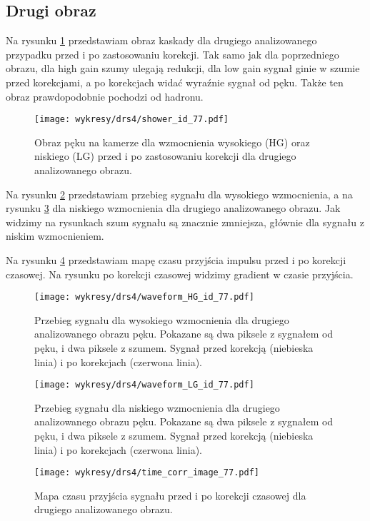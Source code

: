 \documentclass[a4paper,11pt,twoside]{article}
\begin{document}
\subsection{Drugi obraz}
Na rysunku \ref{fig:image_77} przedstawiam obraz kaskady dla drugiego analizowanego przypadku przed i po zastosowaniu korekcji. Tak samo jak dla poprzedniego obrazu, dla high gain szumy ulegają redukcji, dla low gain sygnał ginie w szumie przed korekcjami, a po korekcjach widać wyraźnie sygnał od pęku. Także ten obraz prawdopodobnie pochodzi od hadronu.
\begin{figure}[H] 
\centering
\texttt{[image: wykresy/drs4/shower\_id\_77.pdf]}
\caption{Obraz pęku na kamerze dla wzmocnienia wysokiego (HG) oraz niskiego (LG) przed i po zastosowaniu korekcji dla drugiego analizowanego obrazu.}
\label{fig:image_77}
\end{figure}
Na rysunku \ref{fig:waveform_77_hg} przedstawiam przebieg sygnału dla wysokiego wzmocnienia, a na rysunku \ref{fig:waveform_77_lg} dla niskiego wzmocnienia dla drugiego analizowanego obrazu. Jak widzimy na rysunkach szum sygnału są znacznie zmniejsza, głównie dla sygnału z niskim wzmocnieniem. 

Na rysunku \ref{fig:map_time_corr_77} przedstawiam mapę czasu przyjścia impulsu przed i po korekcji czasowej. Na rysunku po korekcji czasowej widzimy gradient w czasie przyjścia.
\begin{figure}[H] 
\centering
\texttt{[image: wykresy/drs4/waveform\_HG\_id\_77.pdf]}
\caption{Przebieg sygnału dla wysokiego wzmocnienia dla drugiego analizowanego obrazu pęku. Pokazane są dwa piksele z sygnałem od pęku, i dwa piksele z szumem. Sygnał przed korekcją (niebieska linia) i po korekcjach (czerwona linia).}
\label{fig:waveform_77_hg}
\end{figure}
\begin{figure}[H] 
\centering
\texttt{[image: wykresy/drs4/waveform\_LG\_id\_77.pdf]}
\caption{Przebieg sygnału dla niskiego wzmocnienia dla drugiego analizowanego obrazu pęku. Pokazane są dwa piksele z sygnałem od pęku, i dwa piksele z szumem. Sygnał przed korekcją (niebieska linia) i po korekcjach (czerwona linia).}
\label{fig:waveform_77_lg}
\end{figure}

\begin{figure}[H] 
\centering
\texttt{[image: wykresy/drs4/time\_corr\_image\_77.pdf]}
\caption{Mapa czasu przyjścia sygnału przed i po korekcji czasowej dla drugiego analizowanego obrazu.}
\label{fig:map_time_corr_77}
\end{figure}
\end{document}
